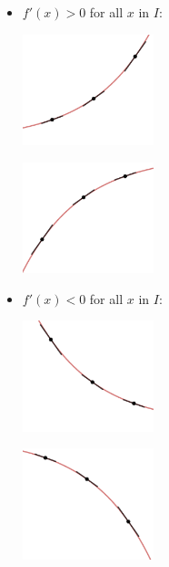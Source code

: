 \documentclass{ximera}
\begin{document}
\begin{itemize}

\item  $f'(x) > 0$  for all $x$ in $I$:

\begin{center}

\begin{multicols}{2}

\includegraphics[width=1.5in]{./AppDerivativesGraphics/IncCU.png} 

\includegraphics[width=1.5in]{./AppDerivativesGraphics/IncCD.png} 

\end{multicols}

\end{center}

\item  $f'(x) < 0$  for all $x$ in $I$:


\begin{center}

\begin{multicols}{2}

\includegraphics[width=1.5in]{./AppDerivativesGraphics/DecCU.png} 

\includegraphics[width=1.5in]{./AppDerivativesGraphics/DecCD.png} 


\end{multicols}
\end{center}
\end{itemize}
\end{document}

